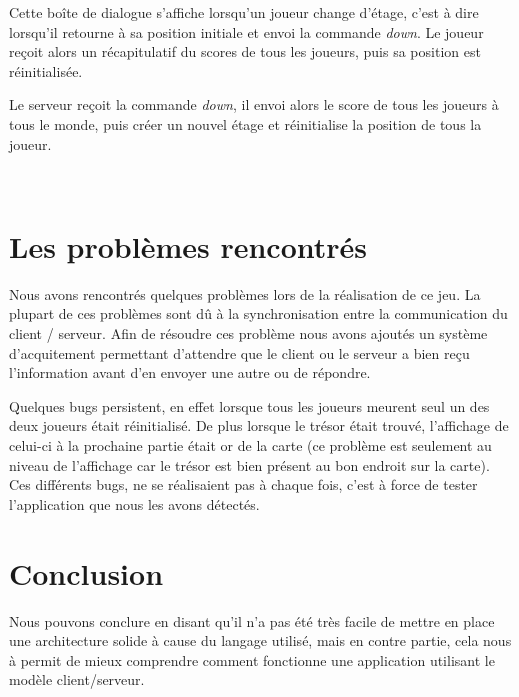 \documentclass[a4paper,10pt]{article}
\begin{document}
		\begin{minipage}[t]{0.46\textwidth}
			\vspace{2pt}
			Cette boîte de dialogue s'affiche lorsqu'un joueur change d'étage, c'est à dire lorsqu'il retourne à sa position initiale et envoi la commande
\emph{down}. Le joueur reçoit alors un récapitulatif du scores de tous les joueurs, puis sa position est réinitialisée.
		\end{minipage}
		\hfill
		\begin{minipage}[t]{0.46\textwidth}
			\vspace{2pt}
			Le serveur reçoit la commande \emph{down}, il envoi alors le score de tous les joueurs à tous le monde, puis créer un nouvel étage et réinitialise
la position de tous la joueur.
		\end{minipage}\\

	\newpage
	\section{Les problèmes rencontrés}
	Nous avons rencontrés quelques problèmes lors de la réalisation de ce jeu. La plupart de ces problèmes sont dû à la synchronisation entre la communication
du client / serveur. Afin de résoudre ces problème nous avons ajoutés un système d'acquitement permettant d'attendre que le client ou le serveur a bien reçu
l'information avant d'en envoyer une autre ou de répondre.

	Quelques bugs persistent, en effet lorsque tous les joueurs meurent seul un des deux joueurs était réinitialisé. De plus lorsque le trésor était trouvé,
l'affichage de celui-ci à la prochaine partie était or de la carte (ce problème est seulement au niveau de l'affichage car le trésor est bien présent au bon
endroit sur la carte). Ces différents bugs, ne se réalisaient pas à chaque fois, c'est à force de tester l'application que nous les avons détectés.
		
	\newpage
	\section{Conclusion}

	Nous pouvons conclure en disant qu'il n'a pas été très facile de mettre en place une architecture solide à cause du langage utilisé, mais en contre partie,
cela nous à permit de mieux comprendre comment fonctionne une application utilisant le modèle client/serveur.
	
	
\end{document}
